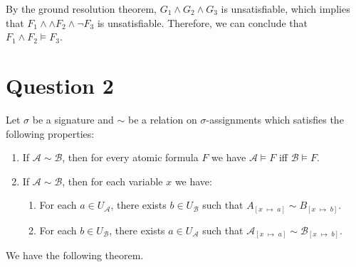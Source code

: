 \documentclass[
  12pt,
  oneside]{article}
\providecommand{\tightlist}{%
  \setlength{\itemsep}{0pt}\setlength{\parskip}{0pt}}
\theoremstyle{definition}
\newcommand\satisfies{\vDash}
\newcommand\entails{\vDash}
\begin{document}
By the ground resolution theorem, \(G_1 \land G_2 \land G_3\) is
unsatisfiable, which implies that \(F_1 \land \land F_2 \land \neg F_3\)
is unsatisfiable. Therefore, we can conclude that
\(F_1 \land F_2 \entails F_3\).

\newpage

\hypertarget{question-2}{%
\section{Question 2}\label{question-2}}

Let \(\sigma\) be a signature and \(\sim\) be a relation on
\(\sigma\)-assignments which satisfies the following properties:

\begin{enumerate}
\def\labelenumi{\arabic{enumi}.}
\tightlist
\item
  If \(\mathcal{A} \sim \mathcal{B}\), then for every atomic formula
  \(F\) we have \(\mathcal{A} \satisfies F\) iff
  \(\mathcal{B} \satisfies F\).
\item
  If \(\mathcal{A} \sim \mathcal{B}\), then for each variable \(x\) we
  have:

  \begin{enumerate}
  \def\labelenumii{\Alph{enumii}.}
  \tightlist
  \item
    For each \(a \in U_{\mathcal{A}}\), there exists
    \(b \in U_{\mathcal{B}}\) such that
    \(A_{[x \;\mapsto\; a]} \sim B_{[x \;\mapsto\; b]}\).
  \item
    For each \(b \in U_{\mathcal{B}}\), there exists
    \(a \in U_{\mathcal{A}}\) such that
    \(\mathcal{A}_{[x \;\mapsto\; a]} \sim \mathcal{B}_{[x \;\mapsto\; b]}\).
  \end{enumerate}
\end{enumerate}

We have the following theorem.
\end{document}
